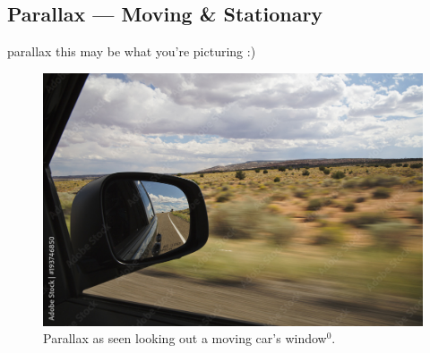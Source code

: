 \documentclass[12pt]{beamer}
\begin{document}
    \subsection{Parallax --- Moving \& Stationary}
        \begin{frame}{parallax} \centering
            this may be what you're picturing :)
            \begin{figure}
                \includegraphics[scale=0.8, fbox, bb=0 0 240 160]{parallaxcar.jpeg}
                \caption{Parallax as seen looking out a moving car's window$^0$.}
            \end{figure}
        \end{frame}
\end{document}

